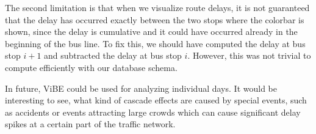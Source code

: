 \documentclass[a4paper,12pt]{article}
\begin{document}
The second limitation is that when we visualize route delays, it is not 
guaranteed that the delay has occurred exactly between the two stops 
where the colorbar is shown, since the delay is cumulative and it could have 
occurred already in the beginning of the bus line. To fix this, we should have 
computed the delay at bus stop $i+1$ and subtracted the delay at bus stop $i$. 
However, this was not trivial to compute efficiently with our database schema.

In future, ViBE could be used for analyzing individual days. It would be 
interesting to see, what kind of cascade effects are caused by special events, 
such as accidents or events attracting large crowds which can cause significant 
delay spikes at a certain part of the traffic network.
\end{document}
